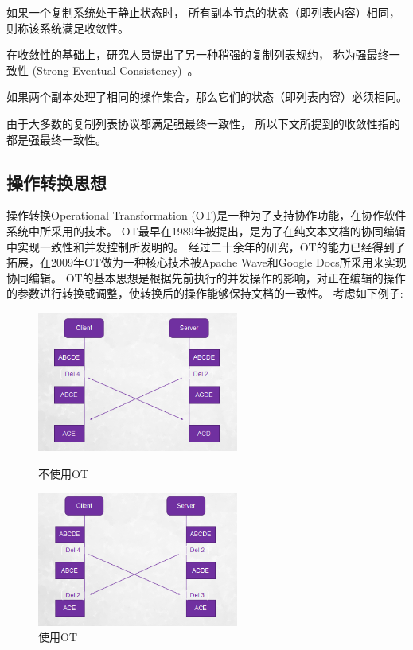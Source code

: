 \begin{definition}
  如果一个复制系统处于静止状态时，
  所有副本节点的状态（即列表内容）相同，
  则称该系统满足收敛性。
\end{definition}

在收敛性的基础上，研究人员提出了另一种稍强的复制列表规约，
称为强最终一致性 (Strong Eventual Consistency)~\cite{Shapiro:SSS11}。
\begin{definition}
  如果两个副本处理了相同的操作集合，那么它们的状态（即列表内容）必须相同。
\end{definition}

由于大多数的复制列表协议都满足强最终一致性，
所以下文所提到的收敛性指的都是强最终一致性。

\subsection{操作转换思想}
操作转换Operational Transformation (OT)是一种为了支持协作功能，在协作软件系统中所采用的技术。
OT最早在1989年被提出，是为了在纯文本文档的协同编辑中实现一致性和并发控制所发明的。
经过二十余年的研究，OT的能力已经得到了拓展，在2009年OT做为一种核心技术被Apache Wave和Google Docs所采用来实现协同编辑。
OT的基本思想是根据先前执行的并发操作的影响，对正在编辑的操作的参数进行转换或调整，使转换后的操作能够保持文档的一致性。
考虑如下例子:

\begin{figure}[t]
\begin{minipage}[t]{0.5\linewidth}
\centering
\includegraphics[width=2.6in]{figures/exm1.bmp}
\caption{不使用OT}
\label{fig:side:a}
\end{minipage}%
\begin{minipage}[t]{0.5\linewidth}
\centering
\includegraphics[width=2.6in]{figures/exm2.bmp}
\caption{使用OT}
\label{fig:side:b}
\end{minipage}
\end{figure}

